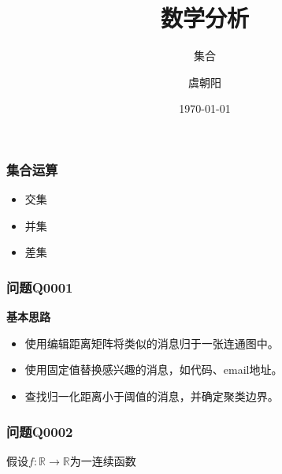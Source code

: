 \documentclass[UTF8]{ctexbeamer}
\begin{document}
\title{数学分析}
\subtitle{集合}
\author{\songti 虞朝阳}
\date{\today}
\frame{\titlepage}



\begin{frame}
\frametitle{集合运算}
\begin{itemize}
\item 交集
\item 并集
\item 差集
\end{itemize}
\end{frame}

\begin{frame}[t]
\frametitle{问题Q0001}
\begin{block}{\textbf{基本思路}}
	\begin{itemize}
		\item<0-> 使用编辑距离矩阵将类似的消息归于一张连通图中。
		\item<0-> 使用固定值替换感兴趣的消息，如代码、email地址。
		\item<0-> 查找归一化距离小于阈值的消息，并确定聚类边界。
	\end{itemize}
\end{block}
\end{frame}

\begin{frame}[t]
\frametitle{问题Q0002}
假设$f:\mathbb{R} \to \mathbb{R}$为一连续函数
\end{frame}
\end{document}
